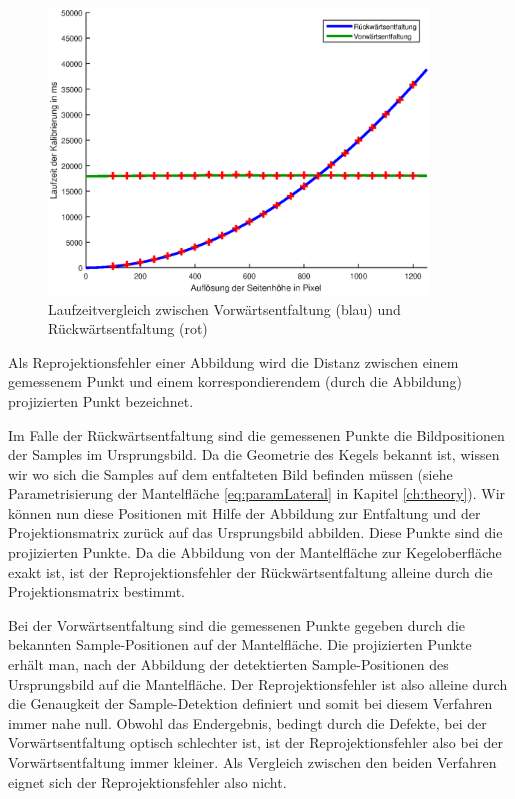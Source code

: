 \begin{figure}[!htb]
	\centering
	\includegraphics[width=0.9\textwidth]{images/runningTimeCalibration.eps}
	\caption{Laufzeitvergleich zwischen Vorwärtsentfaltung (blau) und Rückwärtsentfaltung (rot)}
	\label{fig:runningTimeComparision}
\end{figure}


\bigskip

Als Reprojektionsfehler einer Abbildung wird die Distanz zwischen einem gemessenem Punkt und einem korrespondierendem (durch die Abbildung) projizierten Punkt bezeichnet. 


Im Falle der Rückwärtsentfaltung sind die gemessenen Punkte die Bildpositionen der Samples im Ursprungsbild. Da die Geometrie des Kegels bekannt ist, wissen wir wo sich die  Samples auf dem entfalteten Bild befinden müssen (siehe Parametrisierung der Mantelfläche \ref{eq:paramLateral} in Kapitel \ref{ch:theory}). Wir können nun diese Positionen mit Hilfe der Abbildung zur Entfaltung und der Projektionsmatrix zurück auf das Ursprungsbild abbilden. Diese Punkte sind die projizierten Punkte. Da die Abbildung von der Mantelfläche zur Kegeloberfläche exakt ist, ist der Reprojektionsfehler der Rückwärtsentfaltung alleine durch die Projektionsmatrix bestimmt. 

Bei der Vorwärtsentfaltung sind die gemessenen Punkte gegeben durch die bekannten Sample-Positionen auf der Mantelfläche. Die projizierten Punkte erhält man, nach der Abbildung der detektierten Sample-Positionen des Ursprungsbild auf die Mantelfläche. Der Reprojektionsfehler ist also alleine durch die Genaugkeit der Sample-Detektion definiert und somit bei diesem Verfahren immer nahe null. 
Obwohl das Endergebnis, bedingt durch die Defekte, bei der Vorwärtsentfaltung optisch schlechter ist, ist der Reprojektionsfehler also bei der Vorwärtsentfaltung immer kleiner. 
Als Vergleich zwischen den beiden Verfahren eignet sich der Reprojektionsfehler also nicht.

